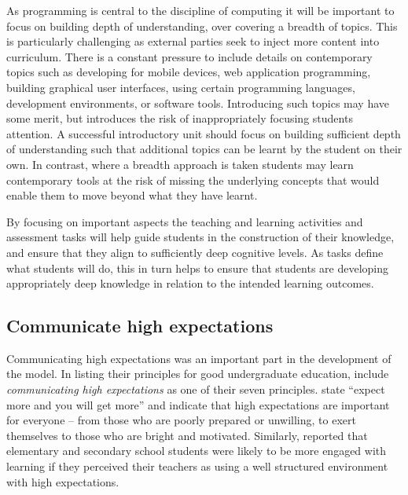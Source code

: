 As programming is central to the discipline of computing \cite{McGettrick:2005} it will be important to focus on building depth of understanding, over covering a breadth of topics. This is particularly challenging as external parties seek to inject more content into curriculum. There is a constant pressure to include details on contemporary topics such as developing for mobile devices, web application programming, building graphical user interfaces, using certain programming languages, development environments, or software tools. Introducing such topics may have some merit, but introduces the risk of inappropriately focusing students attention. A successful introductory unit should focus on building sufficient depth of understanding such that additional topics can be learnt by the student on their own. In contrast, where a breadth approach is taken students may learn contemporary tools at the risk of missing the underlying concepts that would enable them to move beyond what they have learnt.

By focusing on important aspects the teaching and learning activities and assessment tasks will help guide students in the construction of their knowledge, and ensure that they align to sufficiently deep cognitive levels. As tasks define what students will do, this in turn helps to ensure that students are developing appropriately deep knowledge in relation to the intended learning outcomes.


\subsection{Communicate high expectations} %
\label{ssub:have_high_expectations_of_students_}

Communicating high expectations was an important part in the development of the model. In listing their principles for good undergraduate education, \citet{Chickering:1987} include \emph{communicating high expectations} as one of their seven principles. \citet{Chickering:1987} state ``expect more and you will get more'' and indicate that high expectations are important for everyone -- from those who are poorly prepared or unwilling, to exert themselves to those who are bright and motivated. Similarly, \citet{Klem:2004} reported that elementary and secondary school students were likely to be more engaged with learning if they perceived their teachers as using a well structured environment with high expectations. 

